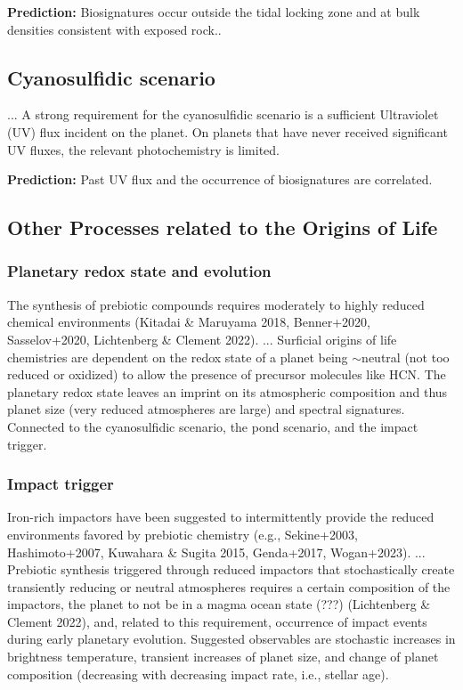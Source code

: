 \documentclass[modern,linenumbers]{aastex631}
\begin{document}
\textbf{Prediction:} Biosignatures occur outside the tidal locking zone and at bulk densities consistent with exposed rock..

\subsection{Cyanosulfidic scenario}
...
A strong requirement for the cyanosulfidic scenario is a sufficient Ultraviolet (UV) flux incident on the planet.
On planets that have never received significant UV fluxes, the relevant photochemistry is limited.

\textbf{Prediction:} Past UV flux and the occurrence of biosignatures are correlated.


\subsection{Other Processes related to the Origins of Life}
\subsubsection{Planetary redox state and evolution}
The synthesis of prebiotic compounds requires moderately to highly reduced chemical environments (Kitadai \& Maruyama 2018, Benner+2020, Sasselov+2020, Lichtenberg \& Clement 2022).
...
Surficial origins of life chemistries are dependent on the redox state of a planet being $\sim$neutral (not too reduced or oxidized) to allow the presence of precursor molecules like HCN. The planetary redox state leaves an imprint on its atmospheric composition and thus planet size (very reduced atmospheres are large) and spectral signatures. Connected to the cyanosulfidic scenario, the pond scenario, and the impact trigger.

\subsubsection{Impact trigger}
Iron-rich impactors have been suggested to intermittently provide the reduced environments favored by prebiotic chemistry (e.g., Sekine+2003, Hashimoto+2007, Kuwahara \& Sugita 2015, Genda+2017, Wogan+2023).
...
Prebiotic synthesis triggered through reduced impactors that stochastically create transiently reducing or neutral atmospheres requires a certain composition of the impactors, the planet to not be in a magma ocean state (???) (Lichtenberg \& Clement 2022), and, related to this requirement, occurrence of impact events during early planetary evolution.
Suggested observables are stochastic increases in brightness temperature, transient increases of planet size, and change of planet composition (decreasing with decreasing impact rate, i.e., stellar age).
\end{document}
